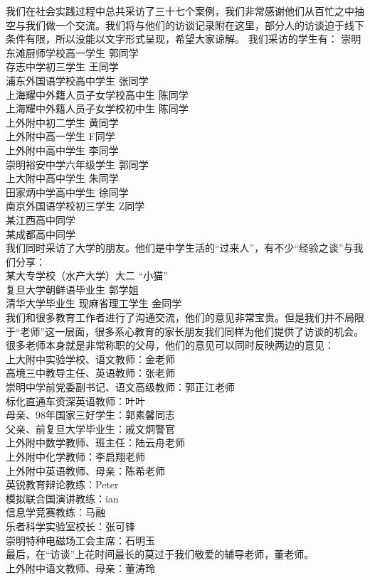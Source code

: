 \documentclass[12pt,UTF8]{ctexart}
\begin{document}
\par {
	
	我们在社会实践过程中总共采访了三十七个案例，我们非常感谢他们从百忙之中抽空与我们做一个交流。我们将与他们的访谈记录附在这里，部分人的访谈迫于线下条件有限，所以没能以文字形式呈现，希望大家谅解。
	我们采访的学生有：
	崇明东滩厨师学校高一学生  郭同学\\
	存志中学初三学生   王同学\\
	浦东外国语学校高中学生   张同学\\
	上海耀中外籍人员子女学校高中生   陈同学\\
	上海耀中外籍人员子女学校初中生   陈同学\\
	上外附中初二学生   黄同学\\
	上外附中高一学生   F同学\\
	上外附中高中学生   李同学\\
	崇明裕安中学六年级学生   郭同学\\
	上大附中高中学生   朱同学\\
	田家炳中学高中学生   徐同学\\
	南京外国语学校初三学生   Z同学\\
	某江西高中同学\\
	某成都高中同学\\
	我们同时采访了大学的朋友。他们是中学生活的“过来人”，有不少“经验之谈”与我们分享：\\
	某大专学校（水产大学）大二   “小猫”\\
	复旦大学朝鲜语毕业生   郭学姐\\
	清华大学毕业生 现麻省理工学生   金同学\\
	
	我们和很多教育工作者进行了沟通交流，他们的意见非常宝贵。但是我们并不局限于“老师”这一层面，很多系心教育的家长朋友我们同样为他们提供了访谈的机会。很多老师本身就是非常称职的父母，他们的意见可以同时反映两边的意见：\\
	上大附中实验学校、语文教师：金老师\\
	高境三中教导主任、英语教师：张老师\\
	崇明中学前党委副书记、语文高级教师：郭正江老师\\
	标化直通车资深英语教师：叶叶\\
	母亲、98年国家三好学生：郭素馨同志\\
	父亲、前复旦大学毕业生：戚文炯警官\\
	上外附中数学教师、班主任：陆云舟老师\\
	上外附中化学教师：李启翔老师\\
	上外附中英语教师、母亲：陈希老师\\
	英锐教育辩论教练：Peter\\
	模拟联合国演讲教练：ian\\
	信息学竞赛教练：马融\\
	乐者科学实验室校长：张可锋\\
	崇明特种电磁场工会主席：石明玉\\
	最后，在“访谈”上花时间最长的莫过于我们敬爱的辅导老师，董老师。\\
	上外附中语文教师、母亲：董涛玲\\
}
\end{document}
